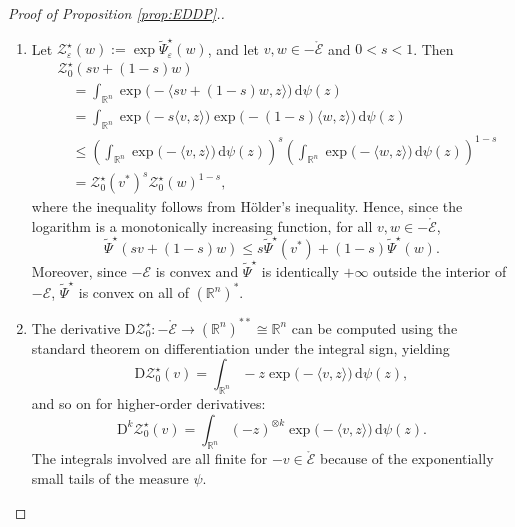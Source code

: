 \documentclass[reqno]{amsart}
\theoremstyle{definition}
\begin{document}
\begin{proof}[Proof of Proposition \ref{prop:EDDP}.]
\begin{enumerate}
		\item Let $\mathcal{Z}_{\varepsilon}^{\star}(w) := \exp {\widetilde{\Psi}}_{\varepsilon}^{\star}(w)$, and let $v, w \in - \mathring{\mathcal{E}}$ and $0 < s < 1$.  Then
		\begin{align*}
			& \mathcal{Z}_{0}^{\star} ( s v + (1 - s) w ) \\
			& \quad = \int_{{\mathbb{R}}^{n}} \exp \big( - \langle s v + (1 - s) w, z \rangle \big) \, {\mathrm{d}} \psi(z) \\
			& \quad = \int_{{\mathbb{R}}^{n}} \exp \big( - s \langle v, z \rangle \big) \exp \big( - (1 - s) \langle w, z \rangle \big) \, {\mathrm{d}} \psi(z) \\
			& \quad \leq \left( \int_{{\mathbb{R}}^{n}} \exp \big( - \langle v, z \rangle \big) \, {\mathrm{d}} \psi(z) \right)^{s} \left( \int_{{\mathbb{R}}^{n}} \exp \big( - \langle w, z \rangle \big) \, {\mathrm{d}} \psi(z) \right)^{1 - s} \\
			& \quad = \mathcal{Z}_{0}^{\star} (v^{\ast})^{s} \mathcal{Z}_{0}^{\star} (w)^{1 - s},
		\end{align*}
		where the inequality follows from H{\"o}lder's inequality.  Hence, since the logarithm is a monotonically increasing function, for all $v, w \in - \mathring{\mathcal{E}}$,
		\[
			{\widetilde{\Psi}}^{\star} ( s v + (1 - s) w ) \leq s {\widetilde{\Psi}}^{\star} (v^{\ast}) + (1 - s) {\widetilde{\Psi}}^{\star} (w).
		\]
		Moreover, since $- {\mathcal{E}}$ is convex and ${\widetilde{\Psi}}^{\star}$ is identically $+ \infty$ outside the interior of $- {\mathcal{E}}$, ${\widetilde{\Psi}}^{\star}$ is convex on all of $({\mathbb{R}}^{n})^{\ast}$.

		\item The derivative ${\mathrm{D}} \mathcal{Z}_{0}^{\star} \colon - \mathring{\mathcal{E}} \to ({\mathbb{R}}^{n})^{\ast \ast} \cong {\mathbb{R}}^{n}$ can be computed using the standard theorem on differentiation under the integral sign, yielding
		\[
			{\mathrm{D}} \mathcal{Z}_{0}^{\star} (v) = \int_{{\mathbb{R}}^{n}} - z \exp \big( - \langle v, z \rangle \big) \, {\mathrm{d}} \psi(z),
		\]
		and so on for higher-order derivatives:
		\[
			{\mathrm{D}}^{k} \mathcal{Z}_{0}^{\star} (v) = \int_{{\mathbb{R}}^{n}} (- z)^{\otimes k} \exp \big( - \langle v, z \rangle \big) \, {\mathrm{d}} \psi(z).	
		\]
		The integrals involved are all finite for $- v \in \mathring{\mathcal{E}}$ because of the exponentially small tails of the measure $\psi$.
	

\end{enumerate}
\end{proof}
\end{document}
